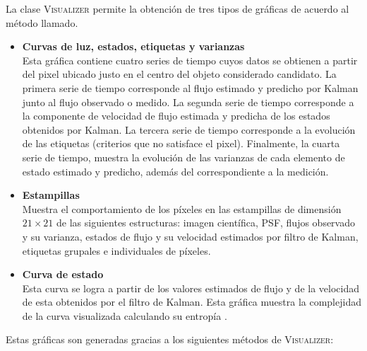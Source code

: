  
La clase \textsc{Visualizer} permite la obtenci\'on de tres tipos de gr\'aficas de acuerdo al m\'etodo llamado.
 
\begin{itemize}
\item \textbf{Curvas de luz, estados, etiquetas y varianzas}\\
Esta gr\'afica contiene cuatro series de tiempo cuyos datos se obtienen a partir del pixel ubicado justo en el centro del objeto considerado candidato. La primera serie de tiempo corresponde al flujo estimado y predicho por Kalman junto al flujo observado o medido. La segunda serie de tiempo corresponde a la componente de velocidad de flujo estimada y predicha de los estados obtenidos por Kalman. La tercera serie de tiempo corresponde a la evoluci\'on de las etiquetas (criterios que no satisface el pixel). Finalmente, la cuarta serie de tiempo, muestra la evolución de las varianzas de cada elemento de estado estimado y predicho, además del correspondiente a la medición.
  
\item \textbf{Estampillas}\\ 
Muestra el comportamiento de los p\'ixeles en las estampillas de dimensi\'on $21 \times 21$ de las siguientes estructuras: imagen cient\'ifica, PSF, flujos observado y su varianza, estados de flujo y su velocidad estimados por filtro de Kalman, etiquetas grupales e individuales de p\'ixeles.
\item \textbf{Curva de estado}\\
 Esta curva se logra a partir de los valores estimados de flujo y de la velocidad de esta obtenidos por el filtro de Kalman. Esta gr\'afica muestra la complejidad de la curva visualizada calculando su entrop\'ia \cite{balestrino}.
\end{itemize}

Estas gr\'aficas son generadas gracias a los siguientes m\'etodos de \textsc{Visualizer}:

